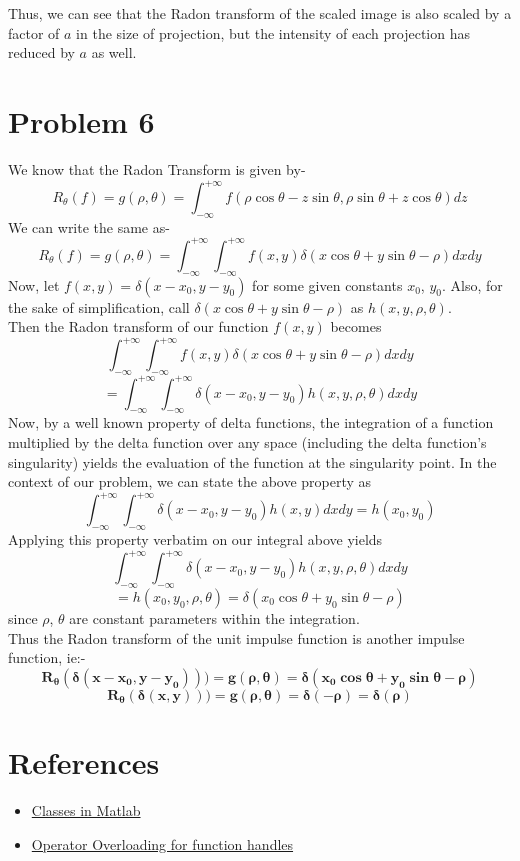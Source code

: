 \documentclass[a4paper,11pt]{article}
\numberwithin{definition}{section}
\numberwithin{mytheorem}{subsection}
\begin{document}
Thus, we can see that the Radon transform of the scaled image is also scaled by a factor of $a$ in the size of projection, but the intensity of each projection has reduced by $a$ as well.
 








\section{Problem 6}

We know that the Radon Transform is given by-
$$R_\theta(f) =g(\rho, \theta)= \int_{-\infty}^{+\infty}f(\rho \cos\theta - z\sin\theta,\rho \sin \theta + z \cos\theta)dz $$
We can write the same as-
$$R_\theta(f) =g(\rho, \theta)= \int_{-\infty}^{+\infty}\int_{-\infty}^{+\infty}f(x,y)\delta(x\cos\theta+y\sin\theta -\rho)dxdy $$
Now, let $f(x, y) = \delta(x-x_0, y-y_0)$ for some given constants $x_0$, $y_0$. Also, for the sake of simplification, call $\delta(x\cos\theta+y\sin\theta -\rho)$ as $h(x, y, \rho, \theta)$.\\
Then the Radon transform of our function $f(x,y)$ becomes
$$\int_{-\infty}^{+\infty}\int_{-\infty}^{+\infty}f(x,y)\delta(x\cos\theta+y\sin\theta -\rho)dxdy$$
$$ = \int_{-\infty}^{+\infty}\int_{-\infty}^{+\infty}\delta(x-x_0, y-y_0)h(x,y,\rho,\theta)dxdy$$
Now, by a well known property of delta functions, the integration of a function multiplied by the delta function over any space (including the delta function's singularity) yields the evaluation of the function at the singularity point. In the context of our problem, we can state the above property as 
$$\int_{-\infty}^{+\infty}\int_{-\infty}^{+\infty}\delta(x-x_0, y-y_0)h(x,y)dxdy = h(x_0, y_0)$$
Applying this property verbatim on our integral above yields
$$\int_{-\infty}^{+\infty}\int_{-\infty}^{+\infty}\delta(x-x_0, y-y_0)h(x,y,\rho,\theta)dxdy$$
$$ = h(x_0, y_0, \rho, \theta) = \delta(x_0\cos\theta+y_0\sin\theta -\rho)$$
since $\rho$, $\theta$ are constant parameters within the integration.\\
Thus the Radon transform of the unit impulse function is another impulse function, ie:-
$$\boldsymbol{R_{\theta}(\delta(x-x_0, y-y_0))) = g(\rho, \theta) = \delta(x_0\cos\theta+y_0\sin\theta -\rho)}$$
$$\boldsymbol{R_{\theta}(\delta(x, y))) = g(\rho, \theta) = \delta(-\rho) = \delta(\rho)}$$




\section{References}
\begin{itemize}
        \item \href{https://www.mathworks.com/help/matlab/matlab_oop/create-a-simple-class.html}{Classes in Matlab} 
        \item \href{https://in.mathworks.com/help/matlab/matlab_oop/implementing-operators-for-your-class.html}{Operator Overloading for function handles}
        
\end{itemize}
\end{document}
